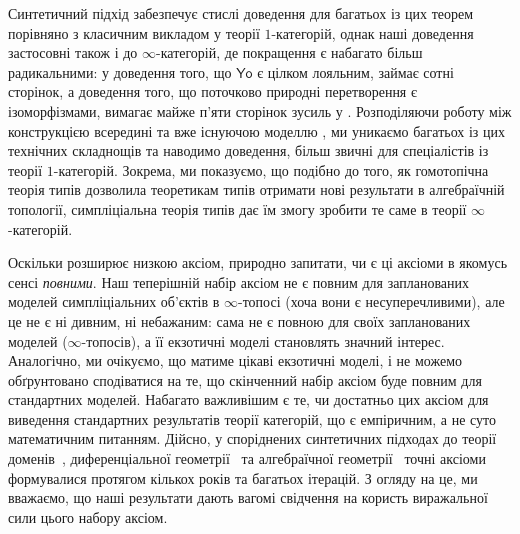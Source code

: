 \documentclass[12pt]{article}
\newcommand{\textcite}{\cite}
\newcommand{\parencite}{\cite}
\newcommand{\Yo}{\mathsf{Yo}}
\begin{document}
Синтетичний підхід забезпечує стислі доведення для багатьох із цих теорем порівняно з класичним викладом у теорії $1$-категорій, однак наші доведення застосовні також і до $\infty$-категорій, де покращення є набагато більш радикальними: у \textcite{lurie:2009} доведення того, що $\Yo$ є цілком лояльним, займає сотні сторінок, а доведення того, що поточково природні перетворення є ізоморфізмами, вимагає майже п'яти сторінок зусиль у \textcite{cisinski:2019}. Розподіляючи роботу між конструкцією всередині \STT{} та вже існуючою моделлю \STT{}, ми уникаємо багатьох із цих технічних складнощів та наводимо доведення, більш звичні для спеціалістів із теорії $1$-категорій. Зокрема, ми показуємо, що подібно до того, як гомотопічна теорія типів дозволила теоретикам типів отримати нові результати в алгебраїчній топології, симпліціальна теорія типів дає їм змогу зробити те саме в теорії $\infty$-категорій.

\begin{rem}
  Оскільки \STT{} розширює \HoTT{} низкою аксіом, природно запитати, чи є ці аксіоми в якомусь сенсі \emph{повними}. Наш теперішній набір аксіом не є повним для запланованих моделей симпліціальних об'єктів в $\infty$-топосі (хоча вони є несуперечливими), але це не є ні дивним, ні небажаним: сама \HoTT{} не є повною для своїх запланованих моделей ($\infty$-топосів), а її екзотичні моделі становлять значний інтерес. Аналогічно, ми очікуємо, що \STT{} матиме цікаві екзотичні моделі, і не можемо обґрунтовано сподіватися на те, що скінченний набір аксіом буде повним для стандартних моделей. Набагато важливішим є те, чи достатньо цих аксіом для виведення стандартних результатів теорії категорій, що є емпіричним, а не суто математичним питанням. Дійсно, у споріднених синтетичних підходах до теорії доменів~\parencite{hyland:1991}, диференціальної геометрії~\parencite{kock:2006} та алгебраїчної геометрії~\parencite{cherubini:2023} точні аксіоми формувалися протягом кількох років та багатьох ітерацій. З огляду на це, ми вважаємо, що наші результати дають вагомі свідчення на користь виражальної сили цього набору аксіом.
\end{rem}
\end{document}
